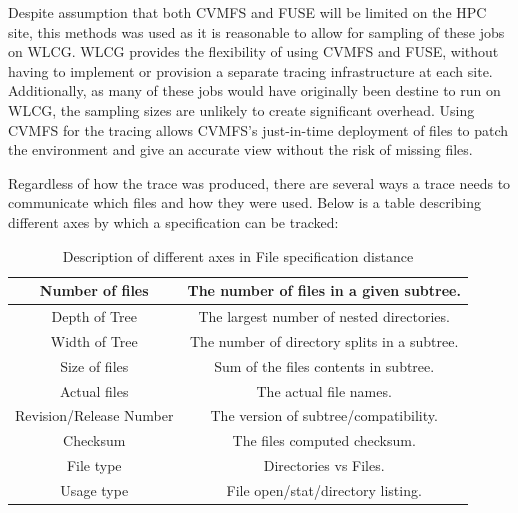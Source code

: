 \documentclass[conference]{IEEEtran}
\begin{document}
Despite assumption that both CVMFS and FUSE will be limited
on the HPC site, this methods was used as it is reasonable to
allow for sampling of these jobs on WLCG. 
WLCG provides the flexibility of using CVMFS and FUSE, without
having to implement or provision a separate tracing infrastructure
at each site.
Additionally, as many of these jobs would have originally been 
destine to run on WLCG, the sampling sizes are unlikely to 
create significant overhead.
Using CVMFS for the tracing allows CVMFS's just-in-time deployment
of files to patch the environment and give an accurate view without
the risk of missing files.

Regardless of how the trace was produced,
there are several ways a trace needs to communicate 
which files and how they were used.
Below is a table describing different axes by which a 
specification can be tracked:
\begin{table}[h]
    \centering
    \begin{tabular}{|c|c|}
    \hline
    Number of files & The number of files in a given subtree. \\ \hline
    Depth of Tree & The largest number of nested directories. \\ \hline
    Width of Tree & The number of directory splits in a subtree.\\ \hline
    Size of files & Sum of the files contents in subtree.\\ \hline
    Actual files & The actual file names.\\ \hline
    Revision/Release Number & The version of subtree/compatibility. \\ \hline
    Checksum & The files computed checksum. \\ \hline
    File type & Directories vs Files.\\ \hline
    Usage type & File open/stat/directory listing.\\ \hline
    \end{tabular}
    \caption{Description of different axes in File specification distance}
    \label{tab:distance_axes}
\end{table}
\end{document}
